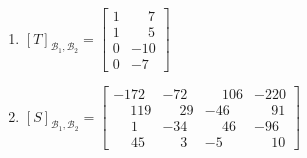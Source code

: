 \documentclass[12pt]{exam}
\begin{document}
\begin{exercicio}
\begin{solucao}
\begin{enumerate}[label={\alph*})]
            \item $[T]_{\mathcal{B}_1, \mathcal{B}_2} = \begin{bmatrix}
                1 & \phantom{-}7\\
                1 & \phantom{-}5\\
                0 & -10\\
                0 & -7
            \end{bmatrix}$

            \item $[S]_{\mathcal{B}_1, \mathcal{B}_2} = \begin{bmatrix}
                -172& -72 & \phantom{-}106 & -220\\
                \phantom{-}119 & \phantom{-}29 & -46 & \phantom{-}91\\
                \phantom{-1}1 & -34 & \phantom{-}46 & -96\\
                \phantom{-1}45 & \phantom{-1}3 & -5 & \phantom{-}10
            \end{bmatrix}$
        \end{enumerate}
    \end{solucao}
\end{exercicio}
\end{document}
